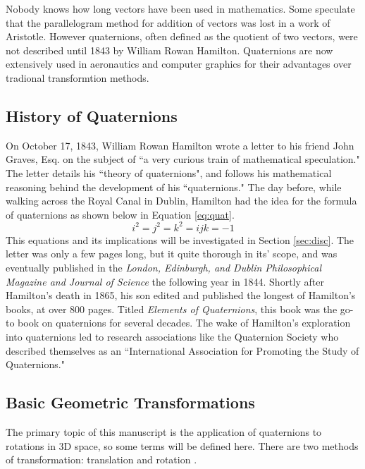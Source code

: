 Nobody knows how long vectors have been used in mathematics.
Some speculate that the parallelogram method for addition of vectors was lost in a work of Aristotle.
However quaternions, often defined as the quotient of two vectors, were not described until 1843 by William Rowan Hamilton.
Quaternions are now extensively used in aeronautics and computer graphics for their advantages over tradional transformtion methods.


\subsection{History of Quaternions}

On October 17, 1843, William Rowan Hamilton wrote a letter to his friend John Graves, Esq. on the subject of ``a very curious train of mathematical speculation."
The letter details his ``theory of quaternions", and follows his mathematical reasoning behind the development of his ``quaternions."
The day before, while walking across the Royal Canal in Dublin, Hamilton had the idea for the formula of quaternions as shown below in Equation \ref{eq:quat}. \cite{manual}
\begin{equation}
\label{eq:quat}
i^2 = j^2 = k^2 = ijk = -1
\end{equation}
This equations and its implications will be investigated in Section \ref{sec:disc}.
The letter was only a few pages long, but it quite thorough in its' scope, and was eventually published in the \textit{London, Edinburgh, and Dublin Philosophical Magazine and Journal of Science} the following year in 1844.
Shortly after Hamilton's death in 1865, his son edited and published the longest of Hamilton's books, at over 800 pages.
Titled \textit{Elements of Quaternions}, this book was the go-to book on quaternions for several decades.
The wake of Hamilton's exploration into quaternions led to research associations like the Quaternion Society who described themselves as an ``International Association for Promoting the Study of Quaternions."

\subsection{Basic Geometric Transformations}
\label{sub:geo}

The primary topic of this manuscript is the application of quaternions to rotations in 3D space, so some terms will be defined here.
There are two methods of transformation: translation and rotation \cite{animation}.

